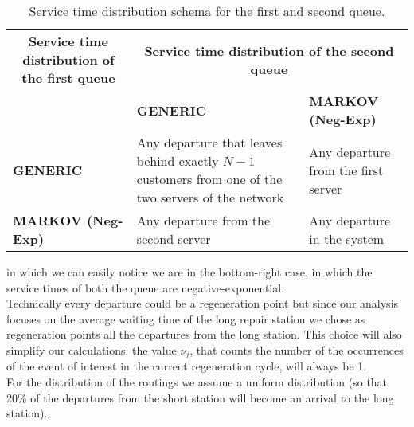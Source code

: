 \documentclass[12pt]{article}
\begin{document}
		\begin{table}[H]
			\centering
			\renewcommand{\arraystretch}{1.5}
			\begin{tabular}{|m{4cm}|m{4cm}|m{4cm}|}
				\hline
				\multicolumn{1}{|c|}{\textbf{Service time distribution of the first queue}} &
				\multicolumn{2}{c|}{\textbf{Service time distribution of the second queue}} \\ 
				\cline{2-3}
				& \textbf{GENERIC} & \textbf{MARKOV (Neg-Exp)} \\ 
				\hline
				\textbf{GENERIC} & Any departure that leaves behind exactly $N - 1$ customers from one of the two servers of the network & Any departure from the first server \\ 
				\hline
				\textbf{MARKOV (Neg-Exp)} & Any departure from the second server & Any departure in the system \\ 
				\hline
			\end{tabular}
			\caption{Service time distribution schema for the first and second queue.}
			\label{table1}
		\end{table}
	in which we can easily notice we are in the bottom-right case, in which the service times of both the queue are negative-exponential.\\
	Technically every departure could be a regeneration point but since our analysis focuses on the average waiting time of the long repair station we chose as regeneration points all the departures from the long station. 
	This choice will also simplify our calculations: the value $\nu_{j}$, that counts the number of the occurrences of the event of interest in the current regeneration cycle, will always be 1. \\
	For the distribution of the routings we assume a uniform distribution (so that 20\% of the departures from the short station will become an arrival to the long station).
\end{document}
